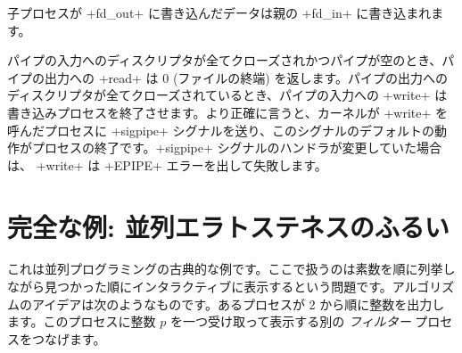 \begin{example}
%
\begin{myimage}[width="45\%"]
\end{myimage}
%
子プロセスが \ml+fd_out+ に書き込んだデータは親の \ml+fd_in+ に書き込まれます。
\end{example}
パイプの入力へのディスクリプタが全てクローズされかつパイプが空のとき、パイプの出力への \ml+read+ は 0 (ファイルの終端) を返します。パイプの出力へのディスクリプタが全てクローズされているとき、パイプの入力への \ml+write+ は書き込みプロセスを終了させます。より正確に言うと、カーネルが \ml+write+ を呼んだプロセスに \ml+sigpipe+ シグナルを送り、このシグナルのデフォルトの動作がプロセスの終了です。\ml+sigpipe+ シグナルのハンドラが変更していた場合は、 \ml+write+ は \ml+EPIPE+ エラーを出して失敗します。

\section{\label{ex/crible}完全な例: 並列エラトステネスのふるい}

これは並列プログラミングの古典的な例です。ここで扱うのは素数を順に列挙しながら見つかった順にインタラクティブに表示するという問題です。アルゴリズムのアイデアは次のようなものです。あるプロセスが 2 から順に整数を出力します。このプロセスに整数 $p$ を一つ受け取って表示する別の \emph{フィルター} プロセスをつなげます。

